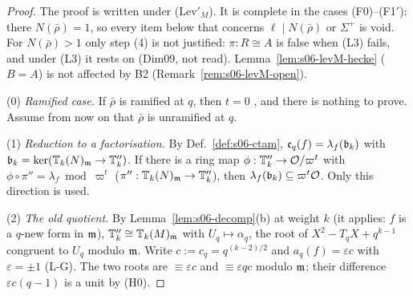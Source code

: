 \begin{proof}
The proof is written under (Lev$'_M$). It is complete in the cases (F0)--(F1$'$): there $N(\bar\rho)=1$, so every item below that concerns
$\ell\mid N(\bar\rho)$ or $\Sigma^+$ is void. For $N(\bar\rho)>1$ only step (4) is not justified: $\pi:R\cong A$ is false when (L3) fails, and under (L3) it rests on
\cite[Lemma~2.4]{KO} (Dim09, not read). Lemma~\ref{lem:s06-levM-hecke} ($B=A$) is not affected by B2 (Remark~\ref{rem:s06-levM-open}).

(0) \emph{Ramified case.} If $\bar\rho$ is ramified at $q$, then $t=0$ \cite[Def.~2.12 and the note after it, p.~6]{KO}
\stcited, and there is nothing to prove. Assume from now on that $\bar\rho$ is unramified at $q$.

(1) \emph{Reduction to a factorisation.} By Def.~\ref{def:s06-ctam}, $\mathfrak{c}_q(f)=\lambda_f(\mathfrak{b}_k)$ with
$\mathfrak{b}_k=\ker(\mathbb{T}_k(N)_{\mathfrak{m}}\to\mathbb{T}''_k)$. If there is a ring map $\phi:\mathbb{T}''_k\to\mathcal{O}/\varpi^t$ with $\phi\circ\pi''=\lambda_f\bmod\varpi^t$
($\pi'':\mathbb{T}_k(N)_{\mathfrak{m}}\to\mathbb{T}''_k$), then $\lambda_f(\mathfrak{b}_k)\subseteq\varpi^t\mathcal{O}$. Only this direction is used. \stproved

(2) \emph{The old quotient.} By Lemma~\ref{lem:s06-decomp}(b) at weight $k$ (it applies: $f$ is a $q$-new form in $\mathfrak{m}$),
$\mathbb{T}''_k\cong\mathbb{T}_k(M)_{\mathfrak{m}}$ with $U_q\mapsto\alpha_q$, the root of $X^2-T_qX+q^{k-1}$ congruent to $U_q$ modulo $\mathfrak{m}$. Write
$c:=c_q=q^{(k-2)/2}$ and $a_q(f)=\varepsilon c$ with $\varepsilon=\pm1$ (L-G). The two roots are $\equiv\varepsilon c$ and $\equiv\varepsilon qc$
modulo $\mathfrak{m}$; their difference $\varepsilon c(q-1)$ is a unit by (H0).


\end{proof}
